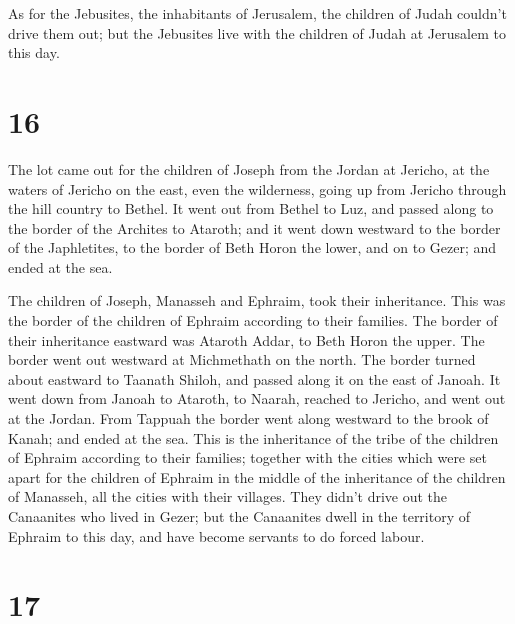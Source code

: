  As for the Jebusites, the inhabitants of Jerusalem, the
children of Judah couldn't drive them out; but the Jebusites live with
the children of Judah at Jerusalem to this day.

\hypertarget{section-15}{%
\section{16}\label{section-15}}

 The lot came out for the children of Joseph from the Jordan
at Jericho, at the waters of Jericho on the east, even the wilderness,
going up from Jericho through the hill country to Bethel. 
It went out from Bethel to Luz, and passed along to the border of the
Archites to Ataroth;  and it went down westward to the
border of the Japhletites, to the border of Beth Horon the lower, and on
to Gezer; and ended at the sea.

 The children of Joseph, Manasseh and Ephraim, took their
inheritance.  This was the border of the children of Ephraim
according to their families. The border of their inheritance eastward
was Ataroth Addar, to Beth Horon the upper.  The border went
out westward at Michmethath on the north. The border turned about
eastward to Taanath Shiloh, and passed along it on the east of Janoah.
 It went down from Janoah to Ataroth, to Naarah, reached to
Jericho, and went out at the Jordan.  From Tappuah the
border went along westward to the brook of Kanah; and ended at the sea.
This is the inheritance of the tribe of the children of Ephraim
according to their families;  together with the cities which
were set apart for the children of Ephraim in the middle of the
inheritance of the children of Manasseh, all the cities with their
villages.  They didn't drive out the Canaanites who lived
in Gezer; but the Canaanites dwell in the territory of Ephraim to this
day, and have become servants to do forced labour.

\hypertarget{section-16}{%
\section{17}\label{section-16}}

